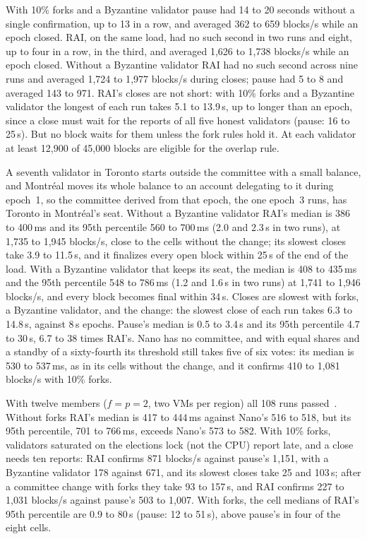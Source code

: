 With 10\% forks and a Byzantine validator pause had 14 to 20 seconds without a single confirmation, up to 13 in a row, and averaged 362 to 659 blocks/s while an epoch closed. RAI, on the same load, had no such second in two runs and eight, up to four in a row, in the third, and averaged 1{,}626 to 1{,}738 blocks/s while an epoch closed. Without a Byzantine validator RAI had no such second across nine runs and averaged 1{,}724 to 1{,}977 blocks/s during closes; pause had 5 to 8 and averaged 143 to 971. RAI's closes are not short: with 10\% forks and a Byzantine validator the longest of each run takes 5.1 to 13.9\,s, up to longer than an epoch, since a close must wait for the reports of all five honest validators (pause: 16 to 25\,s). But no block waits for them unless the fork rules hold it. At each validator at least 12{,}900 of 45{,}000 blocks are eligible for the overlap rule.

A seventh validator in Toronto starts outside the committee with a small balance, and Montr\'eal moves its whole balance to an account delegating to it during epoch~1, so the committee derived from that epoch, the one epoch~3 runs, has Toronto in Montr\'eal's seat. Without a Byzantine validator RAI's median is 386 to 400\,ms and its 95th percentile 560 to 700\,ms (2.0 and 2.3\,s in two runs), at 1{,}735 to 1{,}945 blocks/s, close to the cells without the change; its slowest closes take 3.9 to 11.5\,s, and it finalizes every open block within 25\,s of the end of the load. With a Byzantine validator that keeps its seat, the median is 408 to 435\,ms and the 95th percentile 548 to 786\,ms (1.2 and 1.6\,s in two runs) at 1{,}741 to 1{,}946 blocks/s, and every block becomes final within 34\,s. Closes are slowest with forks, a Byzantine validator, and the change: the slowest close of each run takes 6.3 to 14.8\,s, against 8\,s epochs. Pause's median is 0.5 to 3.4\,s and its 95th percentile 4.7 to 30\,s, 6.7 to 38 times RAI's. Nano has no committee, and with equal shares and a standby of a sixty-fourth its threshold still takes five of six votes: its median is 530 to 537\,ms, as in its cells without the change, and it confirms 410 to 1{,}081 blocks/s with 10\% forks.

With twelve members ($f=p=2$, two VMs per region) all 108 runs passed~\cite{extended}. Without forks RAI's median is 417 to 444\,ms against Nano's 516 to 518, but its 95th percentile, 701 to 766\,ms, exceeds Nano's 573 to 582. With 10\% forks, validators saturated on the elections lock (not the CPU) report late, and a close needs ten reports: RAI confirms 871 blocks/s against pause's 1{,}151, with a Byzantine validator 178 against 671, and its slowest closes take 25 and 103\,s; after a committee change with forks they take 93 to 157\,s, and RAI confirms 227 to 1{,}031 blocks/s against pause's 503 to 1{,}007. With forks, the cell medians of RAI's 95th percentile are 0.9 to 80\,s (pause: 12 to 51\,s), above pause's in four of the eight cells.

